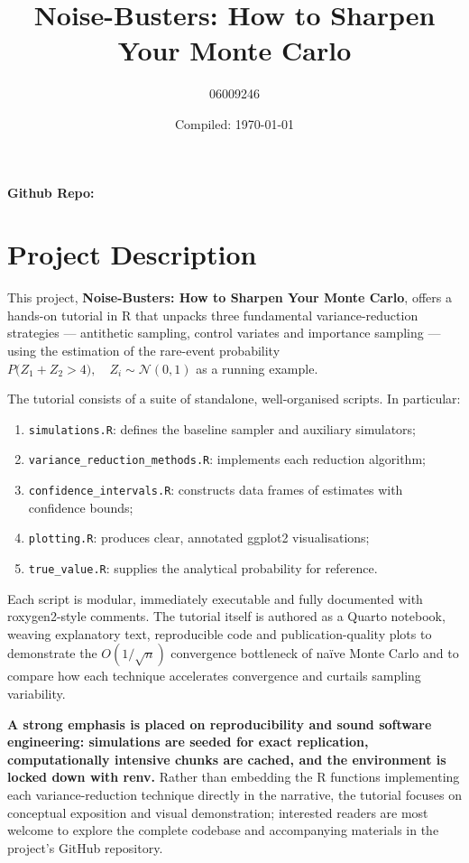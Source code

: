 \documentclass[a4paper, 12pt]{article}
\title{Noise-Busters: How to Sharpen Your Monte Carlo}
\author{06009246}
\date{Compiled: \today}
\begin{document}
\maketitle

\textbf{Github Repo:} \href{https://github.com/kkquest/mc-tutorial-R}{\color{blue}{LINK-TO-THE-TAGGED-RELEASE}}

\section{Project Description}

This project, \textbf{Noise-Busters: How to Sharpen Your Monte Carlo}, 
offers a hands-on tutorial in R that unpacks three fundamental variance-reduction 
strategies — antithetic sampling, control variates and importance sampling — 
using the estimation of the rare-event probability \(P\bigl(Z_1 + Z_2 > 4\bigr), \quad Z_i \sim \mathcal{N}(0,1)\) as a running example. 

The tutorial consists of a suite of standalone, well-organised scripts. 
In particular:

\begin{enumerate}
  \item \texttt{simulations.R}: defines the baseline sampler and auxiliary simulators;
  \item \texttt{variance\_reduction\_methods.R}: implements each reduction algorithm;
  \item \texttt{confidence\_intervals.R}: constructs data frames of estimates with confidence bounds;
  \item \texttt{plotting.R}: produces clear, annotated ggplot2 visualisations;
  \item \texttt{true\_value.R}: supplies the analytical probability for reference.
\end{enumerate}

Each script is modular, immediately executable and fully documented 
with roxygen2-style comments. The tutorial itself is authored as a Quarto notebook, 
weaving explanatory text, reproducible code and publication-quality plots 
to demonstrate the $O(1/\sqrt{n})$ convergence bottleneck of naïve Monte Carlo 
and to compare how each technique accelerates convergence and curtails sampling variability.

\textbf{A strong emphasis is placed on reproducibility and sound software engineering: 
simulations are seeded for exact replication, computationally intensive chunks are cached, 
and the environment is locked down with renv.} Rather than embedding the R functions 
implementing each variance-reduction technique directly in the narrative, 
the tutorial focuses on conceptual exposition and visual demonstration; 
interested readers are most welcome to explore the complete codebase and 
accompanying materials in the project’s GitHub repository.
\end{document}
